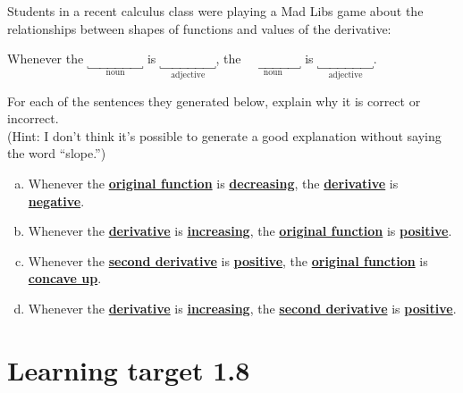 \hrulefill

Students in a recent calculus class were playing a Mad Libs game about the relationships between shapes of functions and values of the derivative:

\vspace{0.5em}
\begin{center}
    Whenever the 
    $\underbracket{\phantom{derivative}}_\text{noun}$ is
    $\underbracket{\phantom{derivative}}_\text{adjective}$,
    the 
    $\underbracket{\phantom{derivative}}_\text{noun}$ is
    $\underbracket{\phantom{derivative}}_\text{adjective}$.
\end{center}
\vspace{0.5em}

For each of the sentences they generated below, explain why it is correct or incorrect. \\
(Hint: I don't think it's possible to generate a good explanation without saying the word ``slope.'')

\begin{enumerate}[(a)]
    \item Whenever the 
    \underline{\textbf{original function}} is
    \underline{\textbf{decreasing}}, the
    \underline{\textbf{derivative}} is
    \underline{\textbf{negative}}.

    \vfill
    \item Whenever the 
    \underline{\textbf{derivative}} is
    \underline{\textbf{increasing}}, the
    \underline{\textbf{original function}} is
    \underline{\textbf{positive}}.

    \vfill
    \item Whenever the 
    \underline{\textbf{second derivative}} is
    \underline{\textbf{positive}}, the
    \underline{\textbf{original function}} is
    \underline{\textbf{concave up}}.

    \vfill
    \item Whenever the 
    \underline{\textbf{derivative}} is
    \underline{\textbf{increasing}}, the
    \underline{\textbf{second derivative}} is
    \underline{\textbf{positive}}.

    \vfill
\end{enumerate}
\vspace{-3em}

\pagebreak

\section{Learning target 1.8}%


